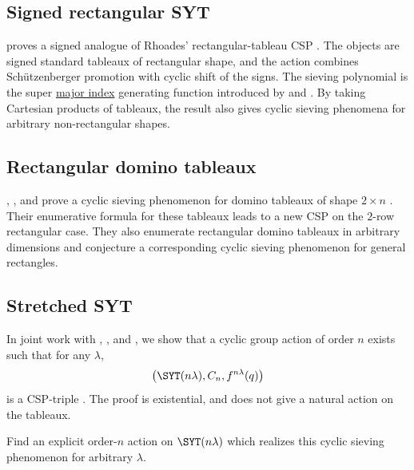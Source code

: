 \subsection[cspSignedRectangularSYT]{Signed rectangular SYT}

 proves a signed analogue of Rhoades'
rectangular-tableau CSP \cite{Pfannerer2026SuperMajor}.  The objects are
signed standard tableaux of rectangular shape, and the action combines
Sch{\"u}tzenberger promotion with cyclic shift of the signs.  The sieving
polynomial is the super \hyperref[majorIndex]{major index} generating function introduced by
 and .  By taking Cartesian products of
tableaux, the result also gives cyclic sieving phenomena for arbitrary
non-rectangular shapes.


\subsection[cspRectangularDominoTableaux]{Rectangular domino tableaux}

, , and
 prove a cyclic sieving phenomenon for domino tableaux
of shape $2\times n$ \cite{ColmenarejoTennerThompson2026x}.  Their enumerative
formula for these tableaux leads to a new CSP on the $2$-row rectangular case.
They also enumerate rectangular domino tableaux in arbitrary dimensions and
conjecture a corresponding cyclic sieving phenomenon for general rectangles.




\subsection[cspStretchedSYT]{Stretched SYT}

In joint work with , , and
, we show that a cyclic group action of order $n$ exists
such that
for any $\lambda$,
\[
 \left( \SYT( n \lambda), C_n, f^{n \lambda}(q) \right)
\]
is a CSP-triple \cite[Thm.~46]{AlexanderssonPfannererRubeyUhlin2020x}.
The proof is existential, and does not give a natural action on the tableaux.

\begin{problem}
Find an explicit order-$n$ action on $\SYT(n\lambda)$ which realizes this
cyclic sieving phenomenon for arbitrary $\lambda$.
\end{problem}



